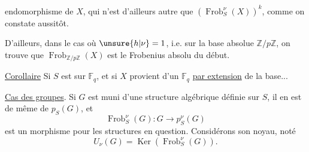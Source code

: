 endomorphisme de $X$, qui n'est d'ailleurs autre que
$(\operatorname{Frob}_S^\nu(X))^k$, comme on constate aussitôt.

D'ailleurs, dans le cas où $\unsure{h|\nu}=1$, i.e.
sur la base absolue $\mathbb Z/p\mathbb Z$, on trouve que
$\operatorname{Frob}_{\mathbb Z/p\mathbb Z}(X)$ est le Frobenius absolu du début.

\uline{Corollaire} Si $S$ est sur $\mathbb F_q$, et si $X$ provient d'un
  $\mathbb F_q$ \uline{par extension} de la base...

\uline{Cas des groupes}. Si $G$ est muni d'une
structure algébrique définie sur $S$, il en est
de même de $p_S(G)$, et 
\[
\operatorname{Frob}_S^\nu(G):G\longrightarrow p_S^\nu(G)
\]
est un morphisme pour les structures en question.
Considérons son noyau, noté
\[
U_\nu(G)=\operatorname{Ker}(\operatorname{Frob}_S^\nu(G)).
\]
